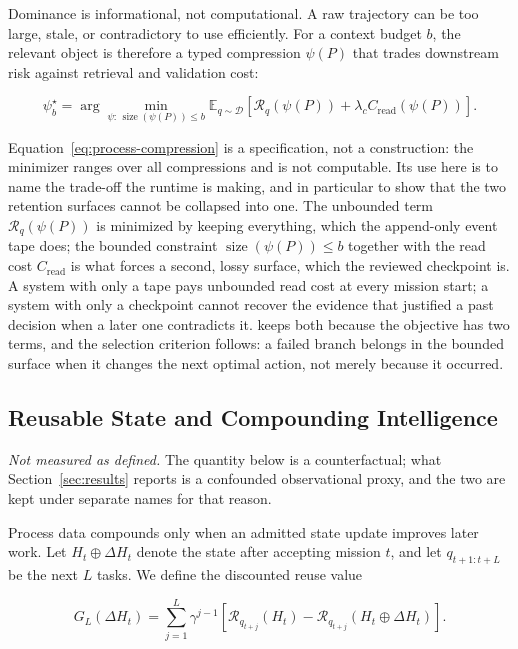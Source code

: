 Dominance is informational, not computational. A raw trajectory can be too large,
stale, or contradictory to use efficiently. For a context budget $b$, the relevant
object is therefore a typed compression $\psi(P)$ that trades downstream risk
against retrieval and validation cost:

\begin{equation}
  \psi_b^\star
  =\arg\min_{\psi:\,\operatorname{size}(\psi(P))\leq b}
  \mathbb{E}_{q\sim\mathcal{D}}
  \left[\mathcal{R}_q(\psi(P))+\lambda_c C_{\mathrm{read}}(\psi(P))\right].
  \label{eq:process-compression}
\end{equation}

Equation~\ref{eq:process-compression} is a specification, not a construction: the
minimizer ranges over all compressions and is not computable. Its use here is to
name the trade-off the runtime is making, and in particular to show that the two
retention surfaces cannot be collapsed into one. The unbounded term
$\mathcal{R}_q(\psi(P))$ is minimized by keeping everything, which the append-only
event tape does; the bounded constraint $\operatorname{size}(\psi(P))\leq b$ together
with the read cost $C_{\mathrm{read}}$ is what forces a second, lossy surface, which
the reviewed checkpoint is. A system with only a tape pays unbounded read cost at
every mission start; a system with only a checkpoint cannot recover the evidence that
justified a past decision when a later one contradicts it. \systemname{} keeps both
because the objective has two terms, and the selection criterion follows: a failed
branch belongs in the bounded surface when it changes the next optimal action, not
merely because it occurred.

\subsection{Reusable State and Compounding Intelligence}

\emph{Not measured as defined.} The quantity below is a counterfactual; what
Section~\ref{sec:results} reports is a confounded observational proxy, and the two
are kept under separate names for that reason.

Process data compounds only when an admitted state update improves later work. Let
$H_t\oplus\Delta H_t$ denote the state after accepting mission $t$, and let
$q_{t+1:t+L}$ be the next $L$ tasks. We define the discounted reuse value

\begin{equation}
  G_L(\Delta H_t)
  =\sum_{j=1}^{L}\gamma^{j-1}
  \left[
    \mathcal{R}_{q_{t+j}}(H_t)
    -\mathcal{R}_{q_{t+j}}(H_t\oplus\Delta H_t)
  \right].
  \label{eq:reuse-value}
\end{equation}

